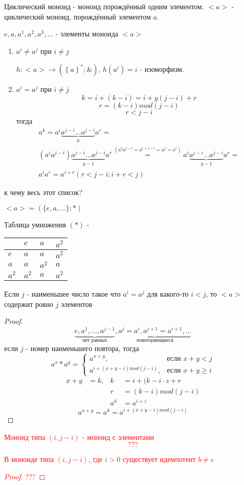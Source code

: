 \documentclass[../main/document.tex]{subfiles}
\begin{document}
\begin{dfn}
Циклический моноид - моноид порождённый одним элементом. $<a>$ - циклический моноид, порождённый элементом $a$. 

$e,a,a^1,a^2,a^3,...$ - элементы моноида $<a>$

\begin{enumerate}
\item $a^i\neq a^j$ при $i\neq j$

$h:<a>\rightarrow ({\left\{a\right\}}^*;\&)$, $h(a^i)=i$ - изоморфизм.
\item $a^i=a^j$ при $i\neq j$
$$k=i+(k-i)=i+y(j-i)+r$$
$$r=(k-i)mod(j-i)$$
$$r<j-i$$
тогда
\begin{multline*}
a^k=a^i\underbrace{a^{j-i}...a^{j-i}}_{y}a^r=\\
(a^ia^{j-i})\underbrace{a^{j-i}...a^{j-i}}_{y-1}a^r\stackrel{(a^ia^{j-i}=a^{i+j-i}=a^j=a^i)}{=}a^i\underbrace{a^{j-i}...a^{j-i}}_{y-1}a^r=\\
a^ia^r=a^{i+r} (r<j-i; i+r<j)
\end{multline*}
\end{enumerate}
к чему весь этот список?
\end{dfn}

\begin{exm} \label{cyclical-exm}
$<a>=(\{e,a,...\};*)$

Таблица умножения $(*)$ -
\begin{table}[h]
\centering
\renewcommand*{\arraystretch}{1.4}
\begin{tabular}{|l|l|l|l|}
\hline
  & $e$ & $a$ & $a^2$ \\ \hline
$e$ & $a$ & $a$ & $a^2$ \\ \hline
$a$ & $a$ & $a^2$ & $a$ \\ \hline
$a^2$ & $a^2$ & $a$ & $a^2$ \\
\hline
\end{tabular}
\end{table}
\end{exm}
\begin{thm}
Если $j$ - наименьшее число такое что $a^i=a^j$ для какого-то $i<j$, то $<a>$ содержит ровно $j$ элементов
\begin{proof}
$$\underbrace{e,a^1,...,a^{j-1}}_\text{нет равных},\underbrace{a^j=a^i,a^{j+1}=a^{i+1},...}_\text{повоторяющиеся}$$
если $j$ - номер наименьшего повтора, тогда
$$a^x*a^y=
\begin{cases}
	a^{x+y},& \text{если } x+y<j\\
	a^{i+(x+y-i)mod(j-i)},& \text{если } x+y\geq i
\end{cases}
$$
\begin{align*}
x+y&=k, & k&=i+(k-i\cdot z+r\\
& & r&=(k-i)mod(j-i)\\
& & a^k&=a^{i+z}
\end{align*}
$$a^{x+y}=a^k=a^{i+(x+y-i)mod(j-i)}$$

\end{proof}
\end{thm}
\textcolor{red}{
\begin{dfn}
Моноид типа $(i,j-i)$ - моноид с элементами $$???$$
\end{dfn}}

\textcolor{red}{
\begin{thm}
В моноиде типа $(i,j-i)$, где $i>0$ существует идемпотент $b\neq e$
\begin{proof}
???
\end{proof}
\end{thm}}
\end{document}
